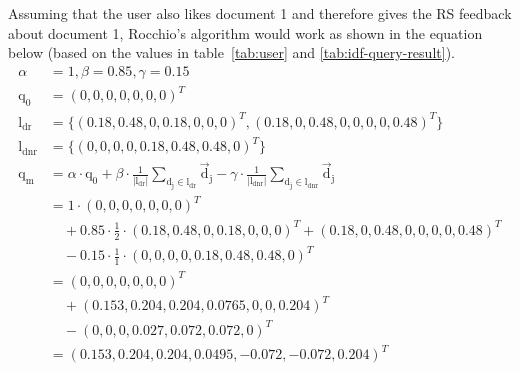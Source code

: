 Assuming that the user also likes document 1 and therefore gives the RS feedback about document 1, Rocchio's algorithm would work as shown in the equation below (based on the values in table~\ref{tab:user} and \ref{tab:idf-query-result}).
\begin{align*}
    \alpha &= 1, \beta = 0.85, \gamma = 0.15\\
    \text{q}_0 &= (0, 0, 0, 0, 0, 0, 0)^T \\
    \text{l}_\text{dr} &= \{(0.18, 0.48, 0, 0.18, 0, 0, 0)^T, (0.18, 0, 0.48, 0, 0, 0, 0, 0.48)^T\}\\
    \text{l}_\text{dnr} &= \{(0, 0, 0, 0, 0.18, 0.48, 0.48, 0)^T\}\\
    \text{q}_\text{m} &=
        \alpha \cdot \text{q}_0
        + \beta \cdot \frac{1}{|\text{l}_\text{dr}|}\sum_{\text{d}_\text{j}\in\text{l}_\text{dr}}\vec{\text{d}}_\text{j}
        - \gamma \cdot \frac{1}{|\text{l}_\text{dnr}|}\sum_{\text{d}_\text{j}\in\text{l}_\text{dnr}}\vec{\text{d}}_\text{j}\\
        &= 1 \cdot (0, 0, 0, 0, 0, 0, 0)^T\\
            &\quad+ 0.85 \cdot \frac{1}{2} \cdot (0.18, 0.48, 0, 0.18, 0, 0, 0)^T+(0.18, 0, 0.48, 0, 0, 0, 0, 0.48)^T\\
            &\quad- 0.15 \cdot \frac{1}{1} \cdot(0, 0, 0, 0, 0.18, 0.48, 0.48, 0)^T\\
        &= (0, 0, 0, 0, 0, 0, 0)^T\\
            &\quad+(0.153, 0.204, 0.204, 0.0765, 0, 0, 0.204)^T\\
            &\quad-(0, 0, 0, 0.027, 0.072, 0.072, 0)^T\\
        &= (0.153, 0.204, 0.204, 0.0495, -0.072, -0.072, 0.204)^T
\end{align*}






